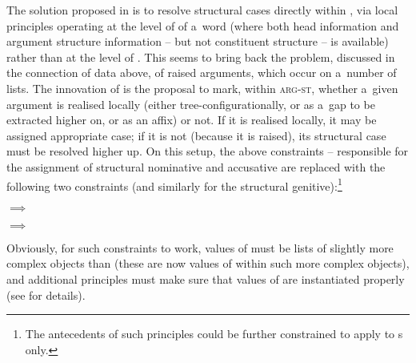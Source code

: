 \documentclass[output=paper]{langsci/langscibook}
\begin{document}
The solution proposed in \citealt{prze:96,Prze99b,Prze99} is to resolve structural cases directly within , via local principles operating at the level of  of a~word (where both head information and argument structure information – but not constituent structure – is available) rather than at the level of .  This seems to bring back the problem, discussed in the connection of  data above, of raised arguments, which occur on a~number of  lists.  The innovation of \citealt{prze:96,Prze99b,Prze99} is the proposal to mark, within \textsc{arg-st}, whether a~given argument is realised locally (either tree-con\-fi\-gu\-ra\-tio\-nal\-ly, or as a~gap to be extracted higher on, or as an affix) or not.  If it is realised locally, it may be assigned appropriate case; if it is not (because it is raised), its structural case must be resolved higher up.  On this setup, the above constraints – responsible for the assignment of structural nominative and accusative are replaced with the following two constraints (and similarly for the structural genitive):\footnote{The antecedents of such principles could be further constrained to apply to s only.}
\begin{examples}
\item \label{nonc:cp:germ1}
  $\implies$ 
\item \label{nonc:cp:germ2}
  $\implies$ 
\end{examples}
Obviously, for such constraints to work, values of  must be lists of slightly more complex objects than  (these are now values of  within such more complex objects), and additional principles must make sure that values of  are instantiated properly (see \citealt[78–79]{Prze99b} for details).
\end{document}
